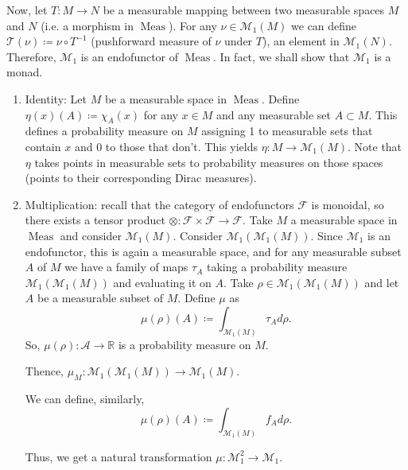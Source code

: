 Now, let $T : M \to N$ be a measurable mapping between two measurable spaces $M$ and $N$ (i.e. a morphism in $\operatorname{Meas}$). For any $\nu \in \mathcal{M}_1(M)$ we can define $\mathcal{T}(\nu)\coloneqq\nu \circ T^{-1}$ (pushforward measure of $\nu$ under $T$), an element in $\mathcal{M}_1(N)$.
Therefore, $\mathcal{M}_1$ is an endofunctor of $\operatorname{Meas}$.
In fact, we shall show that $\mathcal{M}_1$ is a monad. 

\begin{enumerate}
\item Identity: Let $M$ be a measurable space in $\operatorname{Meas}$. Define $\eta(x)(A)\coloneqq\chi_A(x)$ for any $x \in M$ and any measurable set $A \subset M$. This defines a probability measure on $M$ assigning 1 to measurable sets that contain $x$ and $0$ to those that don't. This yields $\eta : M \to \mathcal{M}_1(M)$. Note that $\eta$ takes points in measurable sets to probability measures on those spaces (points to their corresponding Dirac measures).
\item Multiplication: recall that the category of endofunctors $\mathcal{F}$ is monoidal, so there exists a tensor product $\otimes : \mathcal{F} \times \mathcal{F} \to \mathcal{F}$. Take $M$ a measurable space in $\operatorname{Meas}$ and consider $\mathcal{M}_1(M)$. Consider $\mathcal{M}_1(\mathcal{M}_1(M))$. Since $\mathcal{M}_1$ is an endofunctor, this is again a measurable space, and for any measurable subset $A$ of $M$ we have a family of maps $\tau_A$ taking a probability measure $\mathcal{M}_1(\mathcal{M}_1(M))$ and evaluating it on $A$. 
Take $\rho\in \mathcal{M}_1(\mathcal{M}_1(M))$ and let $A$ be a measurable subset of $M$. Define $\mu$ as 
\[
  \mu(\rho)(A)\coloneqq\int_{\mathcal{M}_1(M)} \tau_A d\rho.
\]
So, $\mu(\rho) : \mathcal{A} \to \mathbb{R}$ is a probability measure on $M$.

Thence, $\mu_M : \mathcal{M}_1(\mathcal{M}_1(M)) \to \mathcal{M}_1(M)$.

We can define, similarly,
\[
  \mu(\rho)(A)\coloneqq\int_{\mathcal{M}_1(M)} f_A d\rho.
\]

Thus, we get a natural transformation $\mu : \mathcal{M}_1^2 \to \mathcal{M}_1$.

\end{enumerate}


